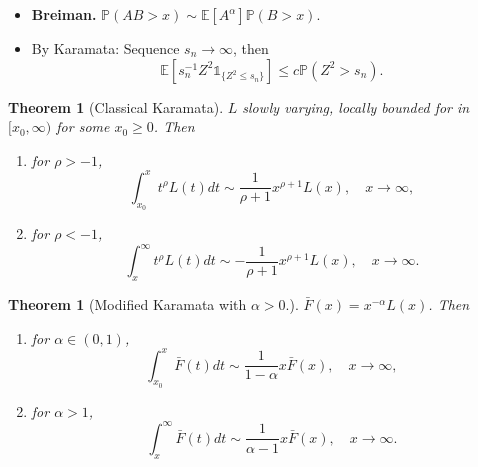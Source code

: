 \documentclass[11pt,reqno]{amsart}
\newcommand{\E}{\mathbb{E}}
\renewcommand{\P}{\mathbb{P}}
\newcommand{\1}{\mathds{1}}
\newcommand{\Fo}{\bar{F}}
\newcommand{\0}{\boldsymbol{0}}
\newcommand{\4}{\mathchoice{\mskip1.5mu}{\mskip1.5mu}{}{}}
\newcommand{\5}{\mathchoice{\mskip-1.5mu}{\mskip-1.5mu}{}{}}
\newcommand{\2}{\penalty250\mskip\thickmuskip\mskip-\thinmuskip} %
\newtheorem{theorem}[lemma]{Theorem}
\begin{document}
\begin{itemize}
\item {\bf Breiman.} $\P(AB>x) \sim \E[A^\alpha] \P(B>x)$.

\item By Karamata: Sequence $s_n\to \infty$, then
\begin{equation*}
\E[s_n^{-1}Z^2\1_{\{Z^2\leq s_n\}}]\leq c \P(Z^2> s_n).
\end{equation*}
\end{itemize}

\begin{theorem}[Classical Karamata]
$L$ slowly varying, locally bounded for in $[x_0,\infty)$ for some $x_0\geq 0$. Then
\begin{enumerate}
\item for $\rho >-1$,
\begin{equation*}
\int_{x_0}^x t^\rho L(t) dt \sim \frac{1}{\rho +1} x^{\rho+1} L(x), \quad x\to \infty,
\end{equation*}
\item for $\rho <-1$,
\begin{equation*}
\int_x^\infty t^\rho L(t) dt \sim -\frac{1}{\rho +1} x^{\rho+1} L(x), \quad x\to \infty.
\end{equation*}
\end{enumerate}
\end{theorem}

\begin{theorem}[Modified Karamata with $\alpha >0$.]
$\Fo(x)= x^{-\alpha} L(x)$. Then
\begin{enumerate}
\item for $\alpha \in (0,1)$,
\begin{equation*}
\int_{x_0}^x \Fo (t) dt \sim \frac{1}{1-\alpha} x \Fo(x), \quad x\to \infty,
\end{equation*}
\item for $\alpha >1$,
\begin{equation*}
\int_x^\infty \Fo (t) dt \sim \frac{1}{\alpha-1} x \Fo(x), \quad x\to \infty.
\end{equation*}
\end{enumerate}
\end{theorem}
\end{document}
